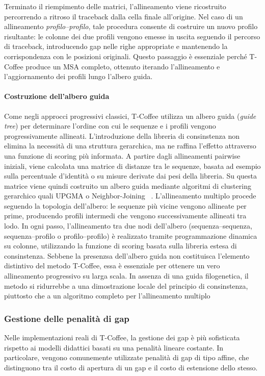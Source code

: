 Terminato il riempimento delle matrici, l’allineamento viene ricostruito
percorrendo a ritroso il traceback dalla cella finale all’origine. Nel caso di
un allineamento \emph{profilo--profilo}, tale procedura consente di costruire un
nuovo profilo risultante: le colonne dei due profili vengono emesse in uscita
seguendo il percorso di traceback, introducendo gap nelle righe appropriate e
mantenendo la corrispondenza con le posizioni originali. Questo passaggio è
essenziale perché T-Coffee produce un MSA completo, ottenuto iterando
l’allineamento e l’aggiornamento dei profili lungo l’albero guida.


\paragraph{Costruzione dell'albero guida}
Come negli approcci progressivi classici, T-Coffee utilizza un albero guida
(\emph{guide tree}) per determinare l'ordine con cui le sequenze e i profili vengono 
progressivamente allineati. L'introduzione della libreria di consinstenza non elimina 
la necessità di una struttura gerarchica, ma ne raffina l'effetto attraverso una funzione di scoring
più informata.
A partire dagli allineamenti pairwise iniziali, viene calcolata una matrice
di distanze tra le sequenze, basata ad esempio sulla percentuale d'identità 
o su misure derivate dai pesi della libreria. Su questa matrice 
viene quindi costruito un albero guida mediante algoritmi di clustering gerarchico
quali UPGMA o Neighbor-Joining ~\cite{saitou1987neighbor}.
L'allineamento multiplo procede seguendo la topologia dell'albero: le 
sequenze più vicine vengono allineate per prime, producendo profili
intermedi che vengono successivamente allineati tra lodo. In ogni passo,
l'allineamento tra due nodi dell'albero (sequenza--sequenza, sequenza--profilo o profilo--profilo)
è realizzato tramite programmazione dinamica su colonne, utilizzando la 
funzione di scoring basata sulla libreria estesa di consinstenza.
Sebbene la presenzsa dell'albero guida non costituisca l'elemento distintivo
del metodo T-Coffee, essa è essenziale per ottenere un vero allineamento 
progressivo su larga scala. In assenza di una guida filogenetica, il metodo 
si ridurrebbe a una dimostrazione locale del principio di consinstenza,
piuttosto che a un algoritmo completo per l'allineamento multiplo

\subsubsection{Gestione delle penalità di gap}
Nelle implementazioni reali di T-Coffee, la gestione dei gap è più
sofisticata rispetto ai modelli didattici basati su una penalità lineare costante.
In particolare, vengono comunemente utilizzate penalità di gap di tipo
affine, che distinguono tra il costo di apertura di un gap e il costo 
di estensione dello stesso.

